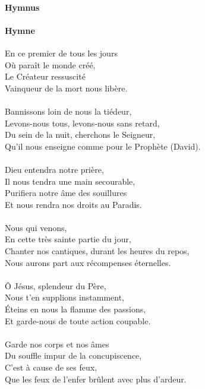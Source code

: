 \documentclass[twoside]{article}
\begin{document}
\begin{paracol}[1]{2}
\switchcolumn*

\paragraph{Hymnus}


\switchcolumn

\paragraph{Hymne}

En ce premier de tous les jours \\
Où paraît le monde créé,\\
Le Créateur ressuscité\\
Vainqueur de la mort nous libère.\\
\\
Bannissons loin de nous la tiédeur,\\
Levons-nous tous, levons-nous sans retard,\\
Du sein de la nuit, cherchons le Seigneur,\\
Qu'il nous enseigne comme pour le Prophète (David).\\
\\
Dieu entendra notre prière,\\
Il nous tendra une main secourable,\\
Purifiera notre âme des souillures\\
Et nous rendra nos droits au Paradis.\\
\\
Nous qui venons,\\
En cette très sainte partie du jour,\\
Chanter nos cantiques, durant les heures du repos,\\
Nous aurons part aux récompenses éternelles.\\
\\
Ô Jésus, splendeur du Père,\\
Nous t'en supplions instamment,\\
Éteins en nous la flamme des passions,\\
Et garde-nous de toute action coupable.\\
\\
Garde nos corps et nos âmes\\
Du souffle impur de la concupiscence,\\
C'est à cause de ses feux,\\
Que les feux de l'enfer brûlent avec plus d'ardeur.\\

\end{paracol}
\end{document}

